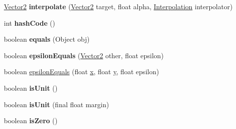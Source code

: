 \begin{DoxyCompactItemize}
\item 
\hypertarget{classairhockeyjava_1_1util_1_1_vector2_af4a7ae27fc144c6fe022d9ceb6d0461a}{}\hyperlink{classairhockeyjava_1_1util_1_1_vector2}{Vector2} {\bfseries interpolate} (\hyperlink{classairhockeyjava_1_1util_1_1_vector2}{Vector2} target, float alpha, \hyperlink{classairhockeyjava_1_1util_1_1_interpolation}{Interpolation} interpolator)\label{classairhockeyjava_1_1util_1_1_vector2_af4a7ae27fc144c6fe022d9ceb6d0461a}

\item 
\hypertarget{classairhockeyjava_1_1util_1_1_vector2_a78f1c2bd3b5d62519769055d140186af}{}int {\bfseries hash\+Code} ()\label{classairhockeyjava_1_1util_1_1_vector2_a78f1c2bd3b5d62519769055d140186af}

\item 
\hypertarget{classairhockeyjava_1_1util_1_1_vector2_a2397b6c4ff3beec3ded05b13c5103f4b}{}boolean {\bfseries equals} (Object obj)\label{classairhockeyjava_1_1util_1_1_vector2_a2397b6c4ff3beec3ded05b13c5103f4b}

\item 
\hypertarget{classairhockeyjava_1_1util_1_1_vector2_af16cd1713c747575165075f23c73453a}{}boolean {\bfseries epsilon\+Equals} (\hyperlink{classairhockeyjava_1_1util_1_1_vector2}{Vector2} other, float epsilon)\label{classairhockeyjava_1_1util_1_1_vector2_af16cd1713c747575165075f23c73453a}

\item 
boolean \hyperlink{classairhockeyjava_1_1util_1_1_vector2_a493bb4a203672fda268bbbae6304c11d}{epsilon\+Equals} (float \hyperlink{classairhockeyjava_1_1util_1_1_vector2_a5cb47d6c109d38c9cd59608e9c94c2e3}{x}, float \hyperlink{classairhockeyjava_1_1util_1_1_vector2_a298d8ff99b5daf0854ecf879b3031ecd}{y}, float epsilon)
\item 
\hypertarget{classairhockeyjava_1_1util_1_1_vector2_ad8c8b42fb7e5fdf8c724713c6f6ae6d5}{}boolean {\bfseries is\+Unit} ()\label{classairhockeyjava_1_1util_1_1_vector2_ad8c8b42fb7e5fdf8c724713c6f6ae6d5}

\item 
\hypertarget{classairhockeyjava_1_1util_1_1_vector2_ab4c9fd25372720829fd8cb2aa1bb1f61}{}boolean {\bfseries is\+Unit} (final float margin)\label{classairhockeyjava_1_1util_1_1_vector2_ab4c9fd25372720829fd8cb2aa1bb1f61}

\item 
\hypertarget{classairhockeyjava_1_1util_1_1_vector2_a6cec8632719894bc1609672adb0cb0e2}{}boolean {\bfseries is\+Zero} ()\label{classairhockeyjava_1_1util_1_1_vector2_a6cec8632719894bc1609672adb0cb0e2}


\end{DoxyCompactItemize}
